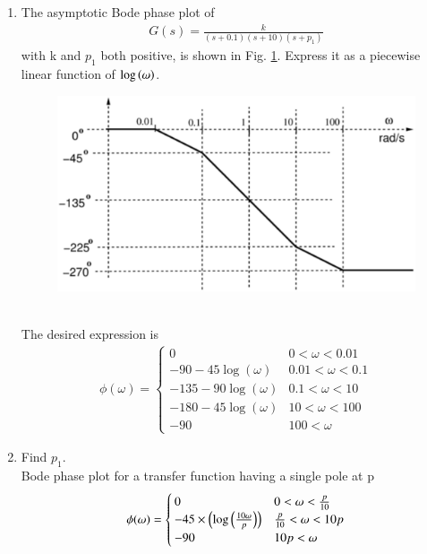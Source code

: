 \begin{enumerate}[label=\thesubsection.\arabic*.,ref=\thesubsection.\theenumi]


\item The asymptotic Bode phase plot of 
%
\begin{align}
\label{eq:ee18btech11037_gs}
G(s) = \frac{k}{(s+0.1)(s+10)(s+{p_1})}
\end{align}
%
with k and $p_1$ both positive, is shown in Fig. \ref{fig:ee18btech11037}.  Express it as a piecewise linear function of $\log \left(\omega\right)$.
\begin{figure}[!ht]
\centering
\includegraphics[width=\columnwidth]{./figs/ee18btech11037/ee18btech11037.eps}
\caption{}
\label{fig:ee18btech11037}
\end{figure}
\\
\solution The desired expression is
\begin{align}
\label{eq:ee18btech11037_totalphase}
 \phi(\omega) = 
 \begin{cases} 
        0 & 0<\omega<0.01 \\
      -90-45\log(\omega)& 0.01<\omega<0.1 \\
      -135-90\log(\omega)& 0.1<\omega<10 \\
      -180-45\log(\omega)& 10<\omega<100 \\
      -90 & 100<\omega  
 \end{cases}
\end{align}

\item Find  $p_1$.
\\
\solution 
Bode phase plot for a transfer function having a single pole at p
\begin{align}
 \phi(\omega) = 
 \begin{cases} 
        0 & 0<\omega< \frac{p}{10} \\
      -45\times\left(\log\left(\frac{10\omega}{p}\right)\right)& \frac{p}{10}<\omega<10p \\
      -90 & 10p<\omega  
 \end{cases}
\end{align}


\end{enumerate}
